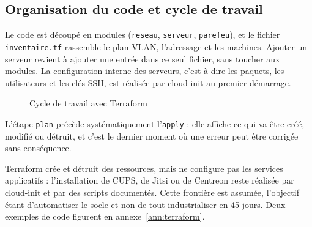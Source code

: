 \documentclass[11pt,a4paper]{article}
\newcommand{\ttb}[1]{\texttt{\small #1}}
\begin{document}
\subsection{Organisation du code et cycle de travail}
Le code est découpé en modules (\ttb{reseau}, \ttb{serveur}, \ttb{parefeu}), et le fichier \ttb{inventaire.tf} rassemble le plan VLAN, l'adressage et les machines. Ajouter un serveur revient à ajouter une entrée dans ce seul fichier, sans toucher aux modules. La configuration interne des serveurs, c'est-à-dire les paquets, les utilisateurs et les clés SSH, est réalisée par cloud-init au premier démarrage.

\begin{figure}[H]
\centering
{}
\caption{Cycle de travail avec Terraform}
\end{figure}

L'étape \ttb{plan} précède systématiquement l'\ttb{apply} : elle affiche ce qui va être créé, modifié ou détruit, et c'est le dernier moment où une erreur peut être corrigée sans conséquence.

Terraform crée et détruit des ressources, mais ne configure pas les services applicatifs : l'installation de CUPS, de Jitsi ou de Centreon reste réalisée par cloud-init et par des scripts documentés. Cette frontière est assumée, l'objectif étant d'automatiser le socle et non de tout industrialiser en 45 jours. Deux exemples de code figurent en annexe~\ref{ann:terraform}.
\end{document}
